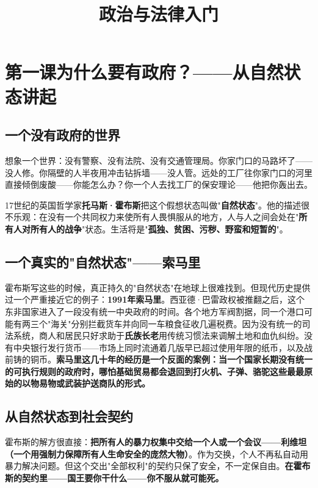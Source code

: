 \documentclass[a4paper,12pt]{ctexart}
\title{\textcolor{blue!70!black}{\Huge\textbf{政治与法律入门}}}
\author{}
\date{}
\begin{document}
\maketitle
\thispagestyle{empty}

\tableofcontents
\newpage

\section{\textcolor{orange!80!black}{第一课\quad 为什么要有政府？——从自然状态讲起}}

\subsection*{一个没有政府的世界}

想象一个世界：没有警察、没有法院、没有交通管理局。你家门口的马路坏了——没人修。你隔壁的人半夜用冲击钻拆墙——没人管。远处的工厂往你家门口的河里直接倾倒废酸——你能怎么办？你一个人去找工厂的保安理论——他把你轰出去。

17世纪的英国哲学家\textbf{托马斯·霍布斯}把这个假想状态叫做"\textbf{自然状态}"。他的描述很不乐观：在没有一个共同权力来使所有人畏惧服从的地方，人与人之间会处在"\textbf{所有人对所有人的战争}"状态。生活将是"\textbf{孤独、贫困、污秽、野蛮和短暂的}"。

\subsection*{一个真实的"自然状态"——索马里}

霍布斯写这些的时候，真正持久的"自然状态"在地球上很难找到。但现代历史提供过一个严重接近它的例子：\textbf{1991年索马里}。西亚德·巴雷政权被推翻之后，这个东非国家进入了一段没有统一中央政府的时间。各个地方军阀割据，同一个港口可能有两三个"海关"分别拦截货车并向同一车粮食征收几遍税费。因为没有统一的司法系统，商人和居民只好求助于\textbf{氏族长老}用传统习惯法来调解土地和血仇纠纷。没有中央银行发行货币——市场上同时流通着几版早已超过使用年限的纸币，以及战前铸的铜币。\textbf{索马里这几十年的经历是一个反面的案例：当一个国家长期没有统一的可执行规则的政府时，哪怕基础贸易都会退回到打火机、子弹、骆驼这些最最原始的以物易物或武装护送商队的形式。}

\subsection*{从自然状态到社会契约}

霍布斯的解方很直接：\textbf{把所有人的暴力权集中交给一个人或一个会议——利维坦（一个用强制力保障所有人生命安全的庞然大物）}。作为交换，个人不再私自动用暴力解决问题。但这个交出"全部权利"的契约只保了安全，不一定保自由。\textbf{在霍布斯的契约里——国王要你干什么——你不服从就可能死。}
\end{document}
